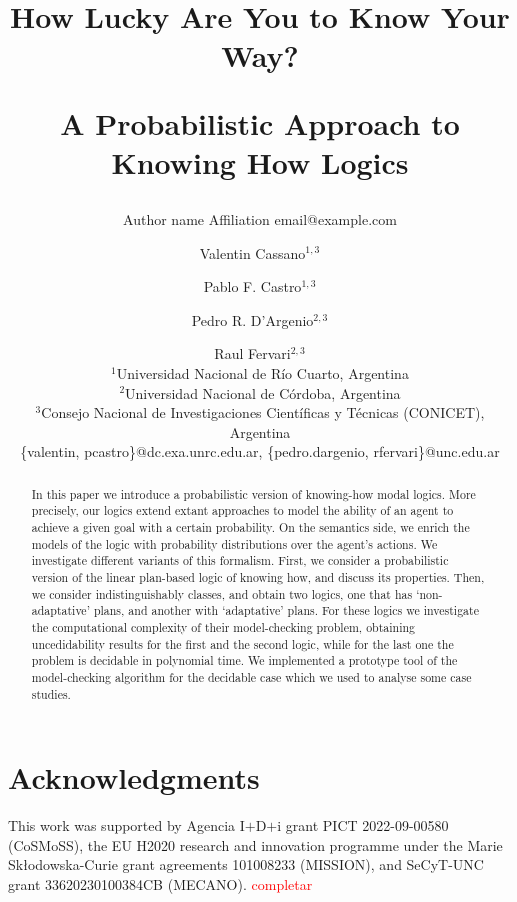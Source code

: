 \documentclass{article}
\title{How Lucky Are You to Know Your Way?\par A Probabilistic Approach to Knowing How Logics}
\author{%
    Author name
    \affiliations
    Affiliation
    \emails
    email@example.com    %
}
\author{%
Valentin Cassano$^{1,3}$\and
Pablo F. Castro$^{1,3}$\and
Pedro R. D'Argenio$^{2,3}$\and
Raul Fervari$^{2,3}$ \\
\affiliations
$^1$Universidad Nacional de R\'io Cuarto, Argentina\\
$^2$Universidad Nacional de C\'ordoba, Argentina\\
$^3$Consejo Nacional de Investigaciones Cient\'ificas y T\'ecnicas (CONICET), Argentina\\
\emails
\{valentin, pcastro\}@dc.exa.unrc.edu.ar,
\{pedro.dargenio, rfervari\}@unc.edu.ar
}
\begin{document}
\maketitle
{}

\begin{abstract}
  In this paper we introduce a probabilistic version of knowing-how modal logics.  More precisely,  our logics extend extant approaches to model the ability of an agent to achieve a given goal with a certain probability.  On the semantics side,  we enrich the models of the logic with probability distributions over the agent's actions.  We investigate different variants of this formalism.  First,  we consider a probabilistic version of the linear plan-based logic of knowing how, and discuss its properties. Then, we consider indistinguishably classes,  and obtain two logics,  one that has `non-adaptative' plans, and another  with `adaptative' plans. For these logics we investigate the computational complexity of their model-checking problem, obtaining uncedidability results for the first and the second logic, while for the last one the problem is decidable in polynomial time.  We implemented a prototype tool of the model-checking algorithm for the decidable case which we used to analyse some case studies.
\end{abstract}






\section*{Acknowledgments}

This work was supported by Agencia I$+$D$+$i grant PICT 2022-09-00580
({\scriptsize CoSMoSS}),
%
the EU H2020 research and innovation programme
under the Marie Sk{\l}odowska-Curie grant agreements 101008233
({\scriptsize MISSION}),
%
and SeCyT-UNC grant 33620230100384CB ({\scriptsize MECANO}).
%
\textcolor{red}{completar}




\appendix






\end{document}

